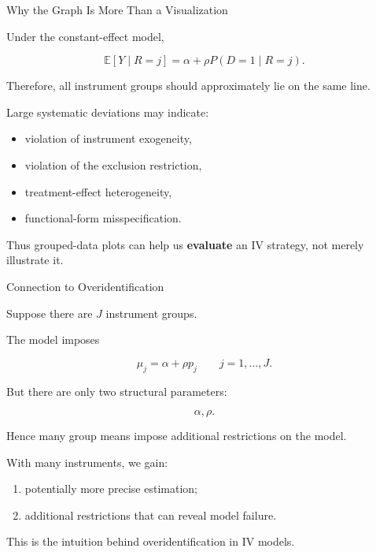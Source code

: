 \documentclass[aspectratio=169]{beamer}
\newcommand{\E}{\mathbb{E}}
\begin{document}
\begin{frame}{Why the Graph Is More Than a Visualization}

Under the constant-effect model,

\[
\E[Y\mid R=j]
=
\alpha+\rho P(D=1\mid R=j).
\]

Therefore, all instrument groups should approximately lie on the same line.

Large systematic deviations may indicate:

\begin{itemize}
    \item violation of instrument exogeneity,
    \item violation of the exclusion restriction,
    \item treatment-effect heterogeneity,
    \item functional-form misspecification.
\end{itemize}

Thus grouped-data plots can help us \textbf{evaluate} an IV strategy, not merely illustrate it.

\end{frame}

\begin{frame}{Connection to Overidentification}

Suppose there are \(J\) instrument groups.

The model imposes

\[
\mu_j=\alpha+\rho p_j
\qquad
j=1,\ldots,J.
\]

But there are only two structural parameters:

\[
\alpha,\rho.
\]

Hence many group means impose additional restrictions on the model.

\vspace{0.3cm}

With many instruments, we gain:

\begin{enumerate}
    \item potentially more precise estimation;
    \item additional restrictions that can reveal model failure.
\end{enumerate}

This is the intuition behind overidentification in IV models.

\end{frame}
\end{document}
